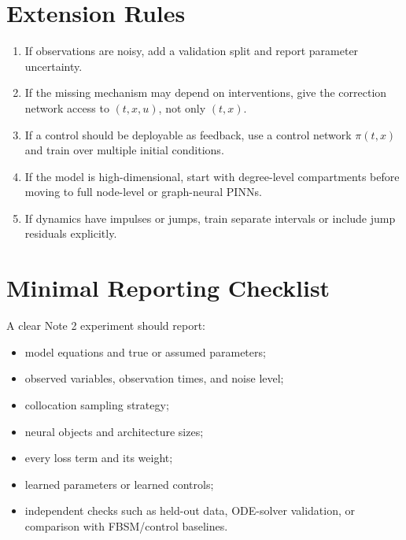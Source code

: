 \documentclass[11pt,a4paper]{article}
\begin{document}
\section{Extension Rules}
\begin{enumerate}
\item If observations are noisy, add a validation split and report parameter uncertainty.
\item If the missing mechanism may depend on interventions, give the correction network access to \((t,x,u)\), not only \((t,x)\).
\item If a control should be deployable as feedback, use a control network \(\pi(t,x)\) and train over multiple initial conditions.
\item If the model is high-dimensional, start with degree-level compartments before moving to full node-level or graph-neural PINNs.
\item If dynamics have impulses or jumps, train separate intervals or include jump residuals explicitly.
\end{enumerate}

\section{Minimal Reporting Checklist}
A clear Note 2 experiment should report:
\begin{itemize}
\item model equations and true or assumed parameters;
\item observed variables, observation times, and noise level;
\item collocation sampling strategy;
\item neural objects and architecture sizes;
\item every loss term and its weight;
\item learned parameters or learned controls;
\item independent checks such as held-out data, ODE-solver validation, or comparison with FBSM/control baselines.
\end{itemize}
\end{document}
